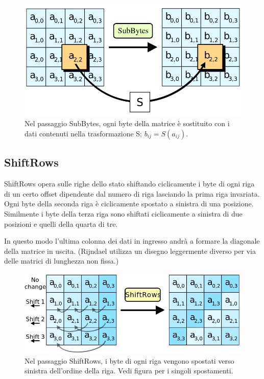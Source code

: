\begin{figure}[H]
\centering
\includegraphics[scale=0.3]{img/subBytes}
\caption{Nel passaggio SubBytes, ogni byte della matrice è sostituito con i dati contenuti nella trasformazione S; \(b_{ij} = S(a_{ij})\).}
\end{figure}

\subsection{ShiftRows}
ShiftRows opera sulle righe dello stato shiftando ciclicamente i byte di ogni riga di un certo offset dipendente dal numero di riga lasciando la prima riga invariata.
Ogni byte della seconda riga è ciclicamente spostato a sinistra di una posizione. Similmente i byte della terza riga sono shiftati ciclicamente a sinistra di due posizioni e quelli della quarta di tre. 

In questo modo l'ultima colonna dei dati in ingresso andrà a formare la diagonale della matrice in uscita. (Rijndael utilizza un disegno leggermente diverso per via delle matrici di lunghezza non fissa.)


\begin{figure}[H]
\centering
\includegraphics[scale=0.3]{img/shiftRows}
\caption{Nel passaggio ShiftRows, i byte di ogni riga vengono spostati verso sinistra dell'ordine della riga. Vedi figura per i singoli spostamenti.}
\end{figure}


